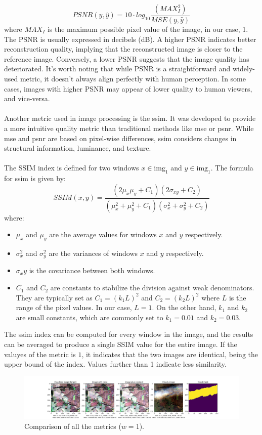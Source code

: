 \[PSNR(y, \hat{y}) = 10 \cdot log_{10} \frac{(MAX_I^2)}{MSE(y, \hat{y})}\]
where $MAX_I$ is the maximum possible pixel value of the image, in our case, 1. The PSNR is usually expressed in decibels (dB). A higher PSNR indicates better reconstruction quality, implying that the reconstructed image is closer to the reference image. Conversely, a lower PSNR suggests that the image quality has deteriorated. It's worth noting that while PSNR is a straightforward and widely-used metric, it doesn't always align perfectly with human perception. In some cases, images with higher PSNR may appear of lower quality to human viewers, and vice-versa. 
\\
\\
Another metric used in image processing is the \gls{ssim}. It was developed to provide a more intuitive quality metric than traditional methods like \gls{mse} or \gls{psnr}. While \gls{mse} and \gls{psnr} are based on pixel-wise differences, \gls{ssim} considers changes in structural information, luminance, and texture.\\
\\
The SSIM index is defined for two windows $x \in \text{img}_1$ and $y \in \text{img}_1$.  The formula for \gls{ssim} is given by:
\[SSIM(x, y) = \frac{(2 \mu_x \mu_y + C_1)(2 \sigma_{xy} + C_2)}{(\mu_x^2 + \mu_y^2 + C_1) (\sigma_x^2 + \sigma_y^2 + C_2)}\]
where:
\begin{itemize}
	\item $\mu_x$ and $\mu_y$ are the average values for windows $x$ and $y$ respectively.
	\item $\sigma_x^2$ and $\sigma_y^2$ are the variances of windows $x$ and $y$ respectively.
	\item $\sigma_xy$ is the covariance between both windows.
	\item $C_1$ and $C_2$ are constants to stabilize the division against weak denominators. They are typically set as $C_1 = (k_1L)^2$ and $C_2 = (k_2L)^2$ where $L$ is the range of the pixel values. In our case, $L = 1$. On the other hand, $k_1$ and $k_2$ are small constants, which are commonly set to $k_1=0.01$ and $k_2=0.03$. 
\end{itemize}
The \gls{ssim} index can be computed for every window in the image, and the results can be averaged to produce a single SSIM value for the entire image. If the valuyes of the metric is $1$, it indicates that the two images are identical, being the upper bound of the index. Values further than 1 indicate less similarity.
\begin{figure}[H]
	\centering
	\begin{adjustwidth}{-5cm}{}
		\includegraphics[width=24cm]{imgs/models/metrics/approach}
	\end{adjustwidth}
	\caption{Comparison of all the metrics ($w=1$).}
	\label{fig:models-metrics-comparison}
\end{figure}
